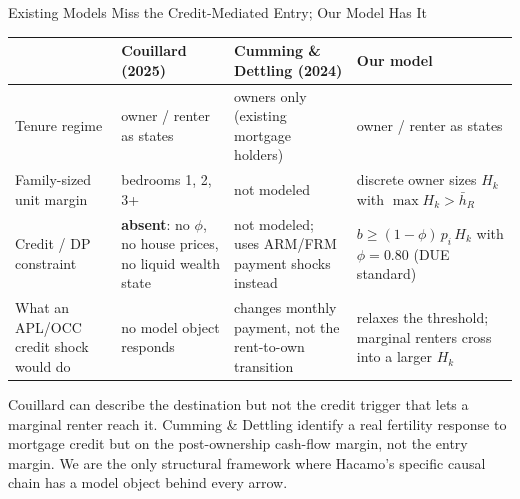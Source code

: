 \documentclass[11pt,aspectratio=169]{beamer}
\begin{document}
\begin{frame}{Existing Models Miss the Credit-Mediated Entry; Our Model Has It}
\small

\centering
\begin{tabular}{p{}p{}p{}p{}}
\toprule
 & \textbf{Couillard (2025)} & \textbf{Cumming \& Dettling (2024)} & \textbf{Our model}\\
\midrule
Tenure regime & owner / renter as states & owners only (existing mortgage holders) & owner / renter as states \\
\addlinespace
Family-sized unit margin & bedrooms 1, 2, 3+ & not modeled & discrete owner sizes $H_k$ with $\max H_k > \bar h_R$ \\
\addlinespace
Credit / DP constraint & \textbf{absent}: no $\phi$, no house prices, no liquid wealth state & not modeled; uses ARM/FRM payment shocks instead & $b \geq (1-\phi)\,p_i\,H_k$ with $\phi = 0.80$ (DUE standard) \\
\addlinespace
What an APL/OCC credit shock would do & no model object responds & changes monthly payment, not the rent-to-own transition & relaxes the threshold; marginal renters cross into a larger $H_k$ \\
\bottomrule
\end{tabular}

\smallskip\flushleft
Couillard can describe the destination but not the credit trigger that lets a marginal renter reach it. Cumming \& Dettling identify a real fertility response to mortgage credit but on the post-ownership cash-flow margin, not the entry margin. We are the only structural framework where Hacamo's specific causal chain has a model object behind every arrow.

\end{frame}
\end{document}
